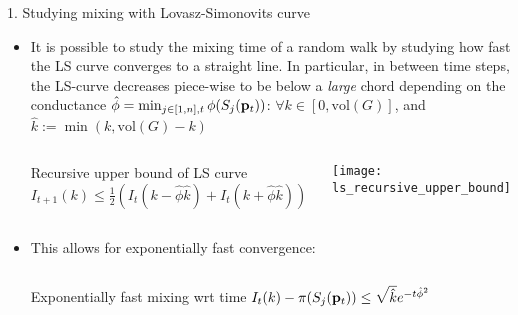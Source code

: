 \documentclass[../main.tex]{subfiles}
\begin{document}
    \begin{frame}{1. Studying mixing with Lovasz-Simonovits curve}
        \begin{itemize}
            \item It is possible to study the mixing time of a random walk by studying how fast the LS curve converges to a straight line. In particular, in between time steps, the LS-curve decreases piece-wise to be below a \textit{large} chord depending on the conductance $\hat{\phi} = \min_{j\in[1,n], t}\phi(S_j(\bold{p}_t))$: $\forall k\in[0,\text{vol}(G)]$, and $\hat{k}:=\min(k, \text{vol}(G)-k)$
                \begin{columns}
                    \begin{block}{Recursive upper bound of LS curve}
                        $I_{t+1}(k) \leq \frac{1}{2}(I_t(k-\hat{\phi} \hat{k}) + I_t(k+\hat{\phi} \hat{k}))$
                    \end{block}
                	\texttt{[image: ls\_recursive\_upper\_bound]}
                \end{columns}
           \item This allows for exponentially fast convergence:
                \begin{columns}
                    \begin{block}{Exponentially fast mixing wrt time}
                        $I_{t}(k) - \pi(S_j(\bold{p}_t)) \leq \sqrt{\hat{k}}e^{-t \hat{\phi}^2}$
                    \end{block}
                \end{columns}
        \end{itemize}
    \end{frame}
    
\end{document}
